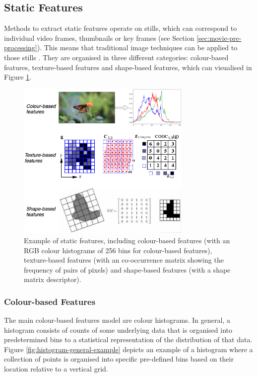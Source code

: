 \subsection{Static Features}

Methods to extract static features operate on stills, which can correspond to individual video frames, thumbnails or key frames (see Section \ref{sec:movie-pre-processing}). This means that traditional image techniques can be applied to those stills \cite{hu2011survey}. They are organised in three different categories: colour-based features, texture-based features and shape-based features, which can visualised in Figure \ref{fig:colour-texture-shape-features}.

\begin{figure}[h]
\centerline{\includegraphics[width=0.75\textwidth]{figures/litsurvey/colour-texture-shape-features.png}}
\caption{\label{fig:colour-texture-shape-features}Example of static features, including colour-based features (with an RGB colour histograms of 256 bins for colour-based features), texture-based features (with an co-occurrence matrix showing the frequency of pairs of pixels) and shape-based features (with a shape matrix descriptor).}
\end{figure}

\subsubsection{Colour-based Features}
\label{sec:color-based-features}

The main colour-based features model are colour histograms. In general, a histogram consists of counts of some underlying data that is organised into predetermined bins to a statistical representation of the distribution of that data. Figure \ref{fig:histogram-general-example} depicts an example of a histogram where a collection of points is organised into specific pre-defined bins based on their location relative to a vertical grid.

